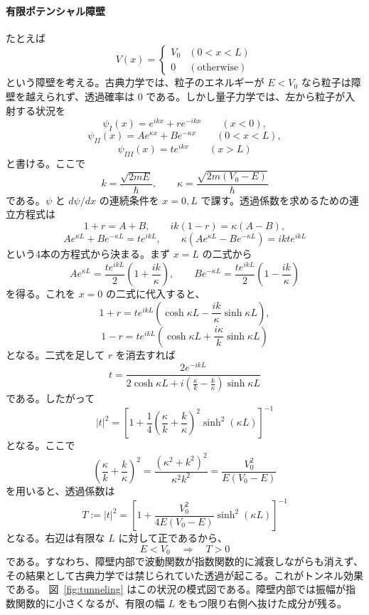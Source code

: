 \paragraph{有限ポテンシャル障壁}
たとえば
\[
V(x)=
\begin{cases}
V_0 & (0 < x < L) \\
0 & (\text{otherwise})
\end{cases}
\]
という障壁を考える。古典力学では、粒子のエネルギーが $E<V_0$ なら粒子は障壁を越えられず、透過確率は $0$ である。しかし量子力学では、左から粒子が入射する状況を
\[
\psi_I(x)=e^{ikx}+r e^{-ikx}\qquad (x<0),
\]
\[
\psi_{II}(x)=A e^{\kappa x}+B e^{-\kappa x}\qquad (0<x<L),
\]
\[
\psi_{III}(x)=t e^{ikx}\qquad (x>L)
\]
と書ける。ここで
\[
k=\frac{\sqrt{2mE}}{\hbar},\qquad
\kappa=\frac{\sqrt{2m(V_0-E)}}{\hbar}
\]
である。$\psi$ と $d\psi/dx$ の連続条件を $x=0,L$ で課す。透過係数を求めるための連立方程式は
\[
1+r=A+B,
\qquad
ik(1-r)=\kappa(A-B),
\]
\[
Ae^{\kappa L}+Be^{-\kappa L}=te^{ikL},
\qquad
\kappa(Ae^{\kappa L}-Be^{-\kappa L})=ikte^{ikL}
\]
という4本の方程式から決まる。まず $x=L$ の二式から
\[
Ae^{\kappa L}
=
\frac{te^{ikL}}{2}\left(1+\frac{ik}{\kappa}\right),
\qquad
Be^{-\kappa L}
=
\frac{te^{ikL}}{2}\left(1-\frac{ik}{\kappa}\right)
\]
を得る。これを $x=0$ の二式に代入すると、
\[
1+r
=
te^{ikL}
\left(
\cosh\kappa L-\frac{ik}{\kappa}\sinh\kappa L
\right),
\]
\[
1-r
=
te^{ikL}
\left(
\cosh\kappa L+\frac{i\kappa}{k}\sinh\kappa L
\right)
\]
となる。二式を足して $r$ を消去すれば
\[
t
=
\frac{2e^{-ikL}}
{2\cosh\kappa L
+i\left(\frac{\kappa}{k}-\frac{k}{\kappa}\right)\sinh\kappa L}
\]
である。したがって
\[
|t|^2
=
\left[
1+\frac{1}{4}
\left(\frac{\kappa}{k}+\frac{k}{\kappa}\right)^2
\sinh^2(\kappa L)
\right]^{-1}
\]
となる。ここで
\[
\left(\frac{\kappa}{k}+\frac{k}{\kappa}\right)^2
=
\frac{(\kappa^2+k^2)^2}{\kappa^2k^2}
=
\frac{V_0^2}{E(V_0-E)}
\]
を用いると、透過係数は
\[
T:=|t|^2
=
\left[
1+\frac{V_0^2}{4E(V_0-E)}\sinh^2(\kappa L)
\right]^{-1}
\]
となる。右辺は有限な $L$ に対して正であるから、
\[
E<V_0 \quad\Longrightarrow\quad T>0
\]
である。すなわち、障壁内部で波動関数が指数関数的に減衰しながらも消えず、その結果として古典力学では禁じられていた透過が起こる。これがトンネル効果である。
図~\ref{fig:tunneling} はこの状況の模式図である。障壁内部では振幅が指数関数的に小さくなるが、有限の幅 $L$ をもつ限り右側へ抜けた成分が残る。

